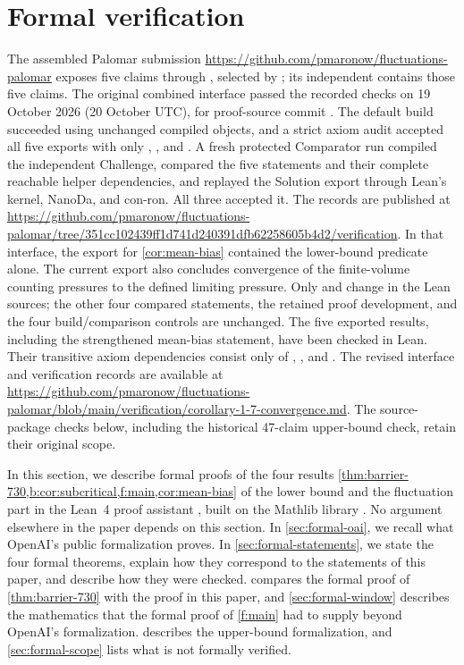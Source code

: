 \chapter{Formal verification}\label{sec:formal}

The assembled Palomar submission
\url{https://github.com/pmaronow/fluctuations-palomar} exposes five
claims through , selected by ; its
independent  contains those five claims. The original
combined interface passed the recorded checks on 19 October 2026
(20 October UTC), for proof-source commit
.
The default build succeeded using unchanged compiled objects, and a
strict axiom audit accepted all five exports with only
, , and .
A fresh protected Comparator run compiled the independent Challenge,
compared the five statements and their complete reachable helper
dependencies, and replayed the Solution export through Lean's kernel,
NanoDa, and con-ron. All three accepted it. The records are published at
\url{https://github.com/pmaronow/fluctuations-palomar/tree/351cc102439ff1d741d240391dfb62258605b4d2/verification}.
In that interface, the export for \cref{cor:mean-bias} contained the
lower-bound predicate alone. The current export also concludes convergence
of the finite-volume counting pressures to the defined limiting pressure.
Only  and  change in the Lean
sources; the other four compared statements, the retained proof
development, and the four build/comparison controls are unchanged.
The five exported results, including the strengthened mean-bias statement,
have been checked in Lean. Their transitive axiom dependencies consist only
of , , and .
The revised interface and verification records are available at
\url{https://github.com/pmaronow/fluctuations-palomar/blob/main/verification/corollary-1-7-convergence.md}.
The source-package checks below, including the
historical 47-claim upper-bound check, retain their original scope.

In this section, we describe formal proofs of the four results
\cref{thm:barrier-730,b:cor:subcritical,f:main,cor:mean-bias} of the lower bound
and the fluctuation part in the Lean~4 proof assistant \cite{lean4}, built on the Mathlib library \cite{mathlib}. No argument elsewhere in the paper depends on this section. In \cref{sec:formal-oai}, we recall what OpenAI's public formalization proves. In \cref{sec:formal-statements}, we state the four formal theorems, explain how they correspond to the statements of this paper, and describe how they were checked.  compares the formal proof of \cref{thm:barrier-730} with the proof in this paper, and \cref{sec:formal-window} describes the mathematics that the formal proof of \cref{f:main} had to supply beyond OpenAI's formalization.  describes the upper-bound formalization, and
\cref{sec:formal-scope} lists what is not formally verified.

